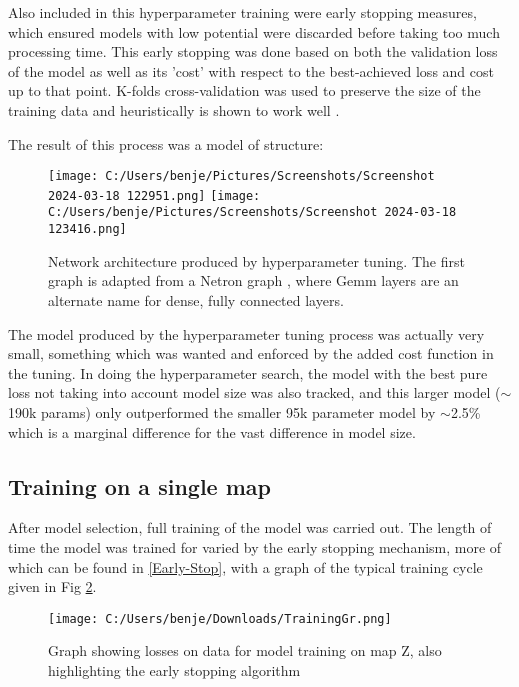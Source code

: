 \documentclass[11pt]{scrartcl}
\begin{document}
Also included in this hyperparameter training were early stopping measures, which ensured models with low potential were discarded before taking too much processing time. This early stopping was done based on both the validation loss of the model as well as its 'cost' with respect to the best-achieved loss and cost up to that point. K-folds cross-validation was used to preserve the size of the training data and heuristically is shown to work well \cite{K-FOLDS}.

The result of this process was a model of structure:


\begin{figure}[H]
\hspace*{-0.8in}
\texttt{[image: C:/Users/benje/Pictures/Screenshots/Screenshot 2024-03-18 122951.png]}
\centering
\texttt{[image: C:/Users/benje/Pictures/Screenshots/Screenshot 2024-03-18 123416.png]}
\caption{Network architecture produced by hyperparameter tuning. The first graph is adapted from a Netron graph \cite{Visualisations}, where Gemm layers are an alternate name for dense, fully connected layers.}
\label{Network}
\end{figure}
\hspace*{0in}
The model produced by the hyperparameter tuning process was actually very small, something which was wanted and enforced by the added cost function in the tuning. In doing the hyperparameter search, the model with the best pure loss not taking into account model size was also tracked, and this larger model ($\sim$190k params) only outperformed the smaller 95k parameter model by $\sim$2.5\% which is a marginal difference for the vast difference in model size.


\subsection{Training on a single map}

After model selection, full training of the model was carried out. The length of time the model was trained for varied by the early stopping mechanism, more of which can be found in \ref{Early-Stop}, with a graph of the typical training cycle given in Fig \ref{train}.

\begin{figure}[H]
\hspace*{0.2in}
\centering
\texttt{[image: C:/Users/benje/Downloads/TrainingGr.png]}
\caption{Graph showing losses on data for model training on map Z, also highlighting the early stopping algorithm}
\label{train}
\end{figure}
\end{document}
